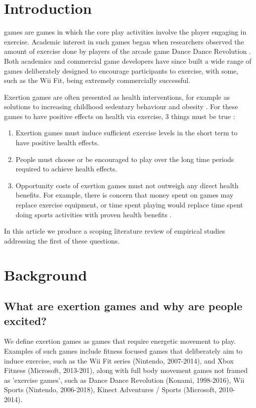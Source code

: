 \section{Introduction}
 games are games in which the core play activities involve the player engaging in exercise. Academic interest in such games began when researchers observed the amount of exercise done by players of the arcade game Dance Dance Revolution \cite{tan2002aerobic}. Both academics and commercial game developers have since built a wide range of games deliberately designed to encourage participants to exercise, with some, such as the Wii Fit, being extremely commercially successful.

Exertion games are often presented as health interventions, for example as solutions to increasing childhood sedentary behaviour and obesity \cite{marshall2017misrepresentation}. For these games to have positive effects on health via exercise, 3 things must be true \cite{Dutta2015EffectsReview}:
\begin{enumerate}
    \item Exertion games must induce sufficient exercise levels in the short term to have positive health effects.
    \item People must choose or be encouraged to play over the long time periods required to achieve health effects.
    \item Opportunity costs of exertion games must not outweigh any direct health benefits. For example, there is concern that money spent on games may replace exercise equipment, or time spent playing would replace time spent doing sports activities with proven health benefits \cite{Dutta2015EffectsReview}.
\end{enumerate}
In this article we produce a scoping literature review \cite{arksey2005scoping} of empirical studies addressing the first of these questions. 

\section{Background}

\subsection{What are exertion games and why are people excited?}

We define exertion games as games that require energetic movement to play. Examples of such games include fitness focused games that deliberately aim to induce exercise, such as the Wii Fit series (Nintendo, 2007-2014), and Xbox Fitness (Microsoft, 2013-201), along with full body movement games not framed as 'exercise games', such as Dance Dance Revolution (Konami, 1998-2016), Wii Sports (Nintendo, 2006-2018), Kinect Adventures / Sports (Microsoft, 2010-2014).  

